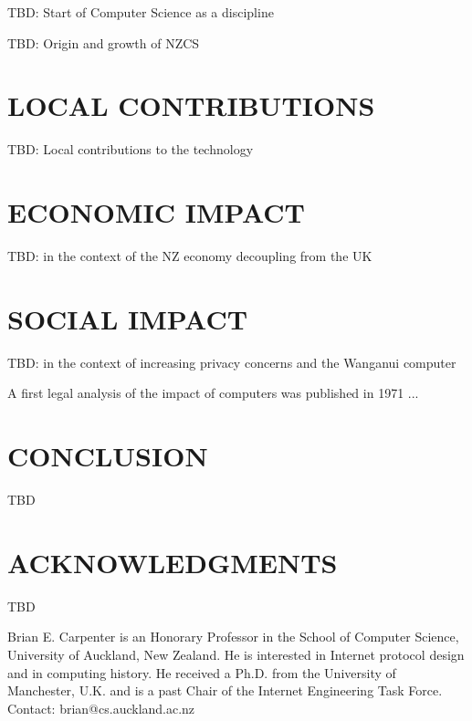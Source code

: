 \documentclass{IEEEcsmag}
\begin{document}
TBD: Start of Computer Science as a discipline

TBD: Origin and growth of NZCS

\vspace*{-8pt}
\section{LOCAL CONTRIBUTIONS}

 TBD: Local contributions to the technology 

\vspace*{-8pt}
\section{ECONOMIC IMPACT}

TBD: in the context of the NZ economy decoupling from the UK

\vspace*{-8pt}
\section{SOCIAL IMPACT}

TBD: in the context of increasing privacy concerns and the Wanganui computer

A first legal analysis of the impact of computers was published in 1971 \cite{Auburn1971}...

\vspace*{-8pt}
\section{CONCLUSION}

TBD

\vspace*{-8pt}
\section{ACKNOWLEDGMENTS}

TBD




\begin{IEEEbiography}{Brian E. Carpenter} is an Honorary Professor in the School of Computer Science, University of Auckland, New Zealand. He is interested in Internet protocol design and in computing history. He received a Ph.D. from the University of Manchester, U.K. and is a past Chair of the Internet Engineering Task Force. Contact: brian@cs.auckland.ac.nz\vspace*{8pt}
\end{IEEEbiography}
\end{document}
